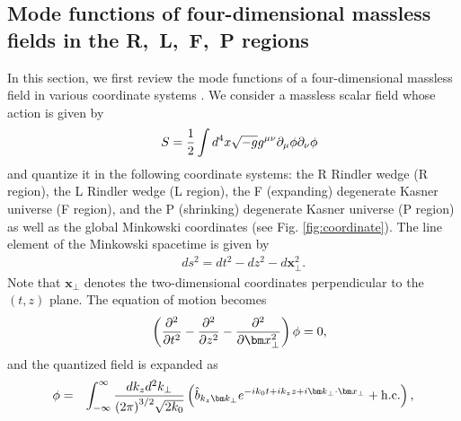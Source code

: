 \documentclass[aps,prd,preprintnumbers,nofootinbib,showpacs]{revtex4}%
\begin{document}
\begin{widetext}
\section{Mode functions of four-dimensional massless fields in the {\rm R},~{\rm L},~{\rm F},~{\rm P} regions}
In this section, we first review the mode functions of a four-dimensional massless field in various
coordinate systems \cite{Higuchi}. 
We consider a massless scalar field whose action is given by 
\begin{eqnarray}
&&S={1\over 2}\int d^4x\sqrt{-g}g^{\mu\nu}\partial_\mu \phi\partial_\nu \phi
\label{fourdaction}
\end{eqnarray}
and quantize it in the following coordinate systems: the R Rindler 
wedge (R region), the L Rindler wedge (L region), the F (expanding) degenerate Kasner 
universe (F region), and the P (shrinking) degenerate Kasner universe (P region)
as well as the global Minkowski coordinates 
 (see Fig. \ref{fig:coordinate}).
The line element of the Minkowski spacetime is given by
\begin{eqnarray}
&&ds^2=dt^2-dz^2-d\bm x_\perp^2.
\label{fourdle}
\end{eqnarray}
Note that $\bm x_\perp$ denotes the two-dimensional coordinates perpendicular
to the $(t,z)$ plane.  
The equation of motion becomes
\begin{eqnarray}
&&\left({\partial^2\over \partial t^2}-{\partial^2\over \partial z^2}-
{\partial^2\over \partial \bm x_\perp^2}\right)\phi=0,
\label{fourdee}
\end{eqnarray}
and the quantized field is expanded as
\begin{eqnarray}
\phi&=&\int_{-\infty}^{\infty} {dk_zd^2k_\perp\over {(2\pi)}^{3/2}\sqrt{2k_0}}
\left( {\hat b}_{k_z\bm k_\perp}e^{-ik_0 t+ik_zz+i{\bm k}_\perp\cdot{\bm x}_\perp}
+{\rm h.c.}
\right)
, 
\end{eqnarray}

\end{widetext}
\end{document}
